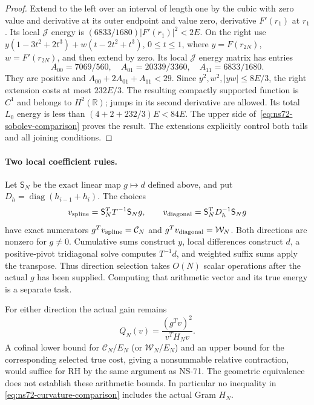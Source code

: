 \documentclass[11pt]{article}
\theoremstyle{remark}
\begin{document}
\begin{proof}
Extend to the left over an interval of length one by the cubic with
zero value and derivative at its outer endpoint and value zero,
derivative $F'(r_1)$ at $r_1$. Its local $\mathcal J$ energy is
$(6833/1680)|F'(r_1)|^2<2E$.
On the right use $y(1-3t^2+2t^3)+w(t-2t^2+t^3)$,
$0\leq t\leq1$, where $y=F(r_{2N})$, $w=F'(r_{2N})$,
and then extend by zero. Its local $\mathcal J$ energy matrix has entries
\[
 A_{00}=7069/560,\quad A_{01}=20339/3360,\quad A_{11}=6833/1680.
\]
They are positive and $A_{00}+2A_{01}+A_{11}<29$.
Since $y^2,w^2,|yw|\leq8E/3$, the right extension costs at most
$232E/3$. The resulting compactly supported function is $C^1$
and belongs to $H^2(\mathbb R)$; jumps in its second derivative
are allowed. Its total $L_0$ energy is less than
$(4+2+232/3)E<84E$.
The upper side of~\eqref{eq:ns72-sobolev-comparison} proves the result.
The extensions explicitly control both tails and all joining conditions.
\end{proof}

\paragraph{Two local coefficient rules.}
Let $\mathsf S_N$ be the exact linear map $g\mapsto d$ defined above,
and put $D_h=\operatorname{diag}(h_{i-1}+h_i)$. The choices
\begin{equation}
 v_{\rm spline}=\mathsf S_N^TT^{-1}\mathsf S_Ng,
 \qquad v_{\rm diagonal}=\mathsf S_N^TD_h^{-1}\mathsf S_Ng
 \label{eq:ns72-local-directions}
\end{equation}
have exact numerators $g^Tv_{\rm spline}=\mathcal C_N$ and
$g^Tv_{\rm diagonal}=\mathcal W_N$.
Both directions are nonzero for $g\ne0$.
Cumulative sums construct $y$, local differences construct $d$, a
positive-pivot tridiagonal solve computes $T^{-1}d$, and weighted suffix
sums apply the transpose. Thus direction selection takes $O(N)$ scalar
operations after the actual $g$ has been supplied. Computing that
arithmetic vector and its true energy is a separate task.

For either direction the actual gain remains
\[
 Q_N(v)=\frac{(g^Tv)^2}{v^TH_Nv}.
\]
A cofinal lower bound for $\mathcal C_N/E_N$ (or $\mathcal W_N/E_N$)
and an upper bound for the corresponding selected true cost, giving a
nonsummable relative contraction, would suffice for RH by the same
argument as NS-71. The geometric equivalence does not establish these
arithmetic bounds. In particular no inequality in
\eqref{eq:ns72-curvature-comparison} includes the actual Gram $H_N$.
\end{document}
